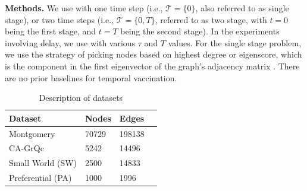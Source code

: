 \noindent
\textbf{Methods.}
We use \algo{} with one time step (i.e., $\mathcal{T}=\{0\}$, also referred to as single stage), or two time steps (i.e., $\mathcal{T}=\{0, T\}$, referred to as two stage, with $t=0$ being the first stage, and $t=T$ being the second stage). In the experiments involving delay, we use \algodelay{} with various $\tau$ and $T$ values. For the single stage problem, we use the strategy of picking nodes based on highest degree or eigenscore, which is the component in the first eigenvector of the graph's adjacency matrix \cite{tong:cikm12}.
There are no prior baselines for temporal vaccination. 





\begin{table}[!h]
\centering
\begin{tabular}{llll}
\hline
 \textbf{Dataset} & \textbf{Nodes} & \textbf{Edges}   \\ \hline
 Montgomery & 70729 & 198138 \\
 CA-GrQc & 5242 & 14496\\
 Small World (SW) & 2500 & 14833 \\   
 Preferential (PA) & 1000 & 1996 \\ \hline
\end{tabular}
\caption{Description of datasets}
\label{tab:datasets}
\end{table}

